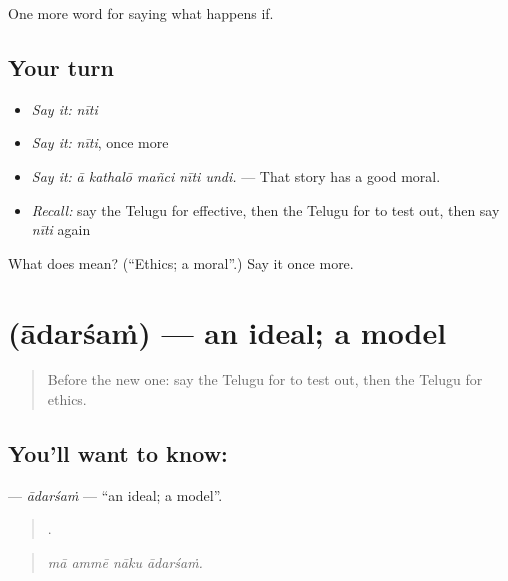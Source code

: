 \begin{grammarlens}[title={What you've built}]
One more word for saying what happens if.
\end{grammarlens}

\subsection*{Your turn}
\begin{itemize}
\raggedright
  \item \emph{Say it:} \emph{nīti}
  \item \emph{Say it:} \emph{nīti}, once more
  \item \emph{Say it:} \emph{ā kathalō mañci nīti undi.} — That story has a good moral.
  \item \emph{Recall:} say the Telugu for effective, then the Telugu for to test out, then say \emph{nīti} again
\end{itemize}

\begin{tcolorbox}[breakable,colback=teal!4,colframe=teal!35!black,title={Before you move on}]
What does  mean? (\textquotedblleft{}Ethics; a moral\textquotedblright{}.) Say it once more.
\end{tcolorbox}
\section[\texorpdfstring{\te{ఆదర్శం} (ādarśaṁ)}{ఆదర్శం (ādarśaṁ)}]{ (ādarśaṁ) — an ideal; a model}

\label{lesson:TE-C432-adarsam}



\begin{quote}
Before the new one: say the Telugu for to test out, then the Telugu for ethics.
\end{quote}

\subsection*{You'll want to know: }
\textbf{} — \emph{ādarśaṁ} — \textquotedblleft{}an ideal; a model\textquotedblright{}.

\begin{quote}
   .
\end{quote}

\begin{quote}
\emph{mā ammē nāku ādarśaṁ.}
\end{quote}

